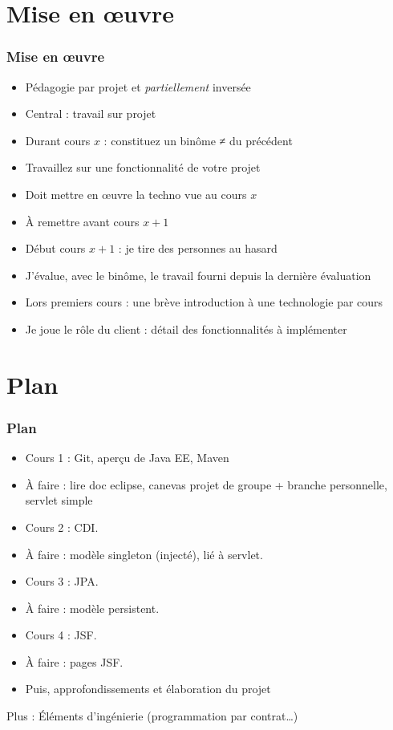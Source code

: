 \documentclass[english, french]{beamer}
\begin{document}
\section{Mise en œuvre}
\begin{frame}
	\frametitle{Mise en œuvre}
	\begin{itemize}
		\item Pédagogie par projet et \emph{partiellement} inversée
		\item Central : travail sur projet
		\item Durant cours $x$ : constituez un binôme ≠ du précédent
		\item Travaillez sur une fonctionnalité de votre projet
		\item Doit mettre en œuvre la techno vue au cours $x$
		\item À remettre avant cours $x + 1$
		\item Début cours $x + 1$ : je tire des personnes au hasard
		\item J’évalue, avec le binôme, le travail fourni depuis la dernière évaluation
		\item Lors premiers cours : une brève introduction à une technologie par cours
		\item Je joue le rôle du client : détail des fonctionnalités à implémenter
	\end{itemize}
\end{frame}

\section{Plan}
\begin{frame}
	\frametitle{Plan}
	
	\begin{itemize}
		\item Cours 1 : Git, aperçu de Java EE, Maven
		\item À faire : lire doc eclipse, canevas projet de groupe + branche personnelle, servlet simple
		\item Cours 2 : CDI.
		\item À faire : modèle singleton (injecté), lié à servlet.
		\item Cours 3 : JPA.
		\item À faire : modèle persistent.
		\item Cours 4 : JSF.
		\item À faire : pages JSF.
		\item Puis, approfondissements et élaboration du projet
	\end{itemize}
	Plus : Éléments d’ingénierie (programmation par contrat…)
\end{frame}
\end{document}
